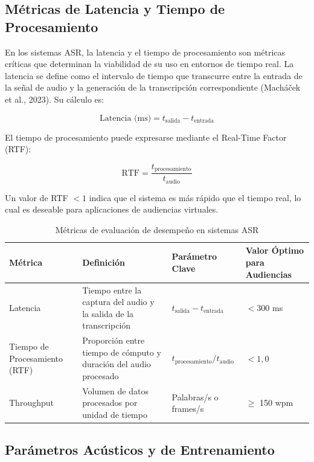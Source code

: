 \documentclass[12pt,a4paper,oneside]{report}
\begin{document}
\subsection{Métricas de Latencia y Tiempo de Procesamiento}

En los sistemas ASR, la latencia y el tiempo de procesamiento son métricas críticas que determinan la viabilidad de su uso en entornos de tiempo real. La latencia se define como el intervalo de tiempo que transcurre entre la entrada de la señal de audio y la generación de la transcripción correspondiente (Macháček et al., 2023). Su cálculo es:

\begin{equation}
\text{Latencia (ms)} = t_{\text{salida}} - t_{\text{entrada}}
\end{equation}

El tiempo de procesamiento puede expresarse mediante el Real-Time Factor (RTF):

\begin{equation}
\text{RTF} = \frac{t_{\text{procesamiento}}}{t_{\text{audio}}}
\end{equation}

Un valor de RTF $< 1$ indica que el sistema es más rápido que el tiempo real, lo cual es deseable para aplicaciones de audiencias virtuales.

\begin{table}[H]
\centering
\caption{Métricas de evaluación de desempeño en sistemas ASR}
\begin{tabular}{|p{2.5cm}|p{3.5cm}|p{3cm}|p{3cm}|}
\hline
\rowcolor{gray!20}
\textbf{Métrica} & \textbf{Definición} & \textbf{Parámetro Clave} & \textbf{Valor Óptimo para Audiencias} \\
\hline
Latencia & Tiempo entre la captura del audio y la salida de la transcripción & $t_{\text{salida}} - t_{\text{entrada}}$ & $< 300$ ms \\
\hline
Tiempo de Procesamiento (RTF) & Proporción entre tiempo de cómputo y duración del audio procesado & $t_{\text{procesamiento}} / t_{\text{audio}}$ & $< 1{,}0$ \\
\hline
Throughput & Volumen de datos procesados por unidad de tiempo & Palabras/s o frames/s & $\geq$ 150 wpm \\
\hline
\end{tabular}
\label{tab:latencia}
\end{table}

\subsection{Parámetros Acústicos y de Entrenamiento}
\end{document}
